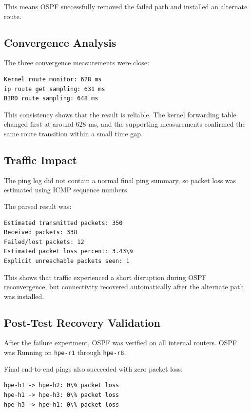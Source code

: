 This means OSPF successfully removed the failed path and installed an alternate route.

\subsection{Convergence Analysis}

The three convergence measurements were close:

\begin{verbatim}
Kernel route monitor: 628 ms
ip route get sampling: 631 ms
BIRD route sampling: 648 ms
\end{verbatim}

This consistency shows that the result is reliable. The kernel forwarding table changed first at around 628 ms, and the supporting measurements confirmed the same route transition within a small time gap.

\subsection{Traffic Impact}

The ping log did not contain a normal final ping summary, so packet loss was estimated using ICMP sequence numbers.

The parsed result was:

\begin{verbatim}
Estimated transmitted packets: 350
Received packets: 338
Failed/lost packets: 12
Estimated packet loss percent: 3.43\%
Explicit unreachable packets seen: 1
\end{verbatim}

This shows that traffic experienced a short disruption during OSPF reconvergence, but connectivity recovered automatically after the alternate path was installed.

\subsection{Post-Test Recovery Validation}

After the failure experiment, OSPF was verified on all internal routers. OSPF was Running on \texttt{hpe-r1} through \texttt{hpe-r8}.

Final end-to-end pings also succeeded with zero packet loss:

\begin{verbatim}
hpe-h1 -> hpe-h2: 0\% packet loss
hpe-h1 -> hpe-h3: 0\% packet loss
hpe-h3 -> hpe-h1: 0\% packet loss
\end{verbatim}

